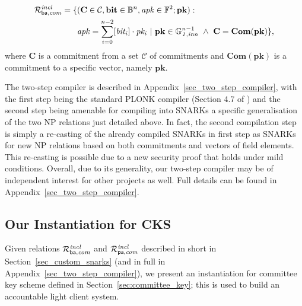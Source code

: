 \begin{align*}
{\mathcal{R}^{\mathit{incl}}_{\mathsf{ba},\mathit{com}}} = \{&(\mathbf{C} \in \mathcal{C}, \mathbf{bit} \in \mathbb{B}^n, \mathit{apk} \in \mathbb{F}^2; \mathbf{pk}) : \\
&\mathit{apk} = \sum_{i=0}^{n-2} [\mathit{bit_i}] \cdot \mathit{pk_i} \ | \ \mathbf{pk} \in \mathbb{G}_{\mathit{1,inn}}^{n-1} \ \wedge \  \mathbf{C} = \mathbf{Com}(\mathbf{pk}) \},
\end{align*}
\noindent where $\mathbf{C}$ is a commitment from a set $\mathcal{C}$ of commitments and $\mathbf{Com}(\mathbf{pk})$ is a commitment to a specific vector, 
namely $\mathbf{pk}$. 

The two-step compiler is described in Appendix~\ref{sec_two_step_compiler}, with the first 
step being the standard PLONK compiler (Section 4.7 of 
\cite{plonk}) and the second step being amenable for compiling into SNARKs a specific 
generalisation of the two NP relations just detailed above. In fact, the second compilation step is simply a re-casting of the already compiled SNARKs in first step 
as SNARKs for new NP relations based on both commitments and vectors of field elements. 
This re-casting is possible due to a new security proof that holds under mild conditions. 
Overall, due to its generality, our two-step compiler may be of independent interest for other projects as well. Full details can be found in Appendix~\ref{sec_two_step_compiler}.
\vspace{-0.05in}

\subsection{Our Instantiation for CKS}
\label{sec:inst_committee_key}
\noindent Given relations $\mathcal{R}^{\mathit{incl}}_{\mathsf{ba},\mathit{com}}$ and $\mathcal{R}^{\mathit{incl}}_{\mathsf{pa},\mathit{com}}$ described in short in Section~\ref{sec_custom_snarks} (and in full in Appendix~\ref{sec_two_step_compiler}), 
we present an instantiation for committee key scheme defined in Section~\ref{sec:committee_key}; 
this is used to build an accountable light client system. %

